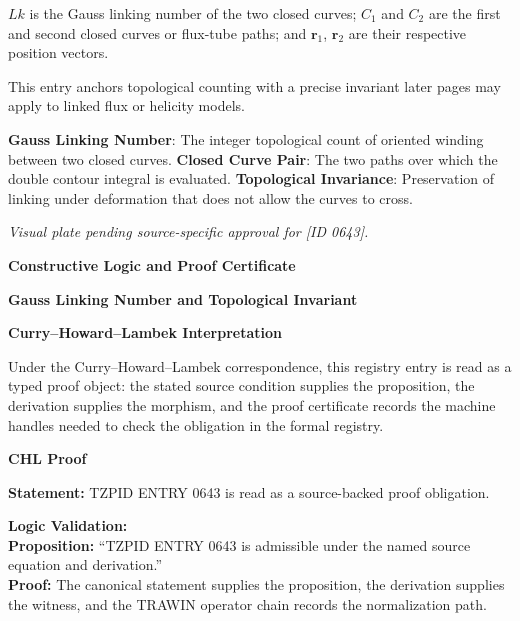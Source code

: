 
\(Lk\) is the Gauss linking number of the two closed curves; \(C_1\) and \(C_2\) are the first and second closed curves or flux-tube paths; and \(\mathbf{r}_1\), \(\mathbf{r}_2\) are their respective position vectors.


This entry anchors topological counting with a precise invariant later pages may apply to linked flux or helicity models.


\noindent \textbf{Gauss Linking Number}: The integer topological count of oriented winding between two closed curves. \enspace\textbullet\enspace \textbf{Closed Curve Pair}: The two paths over which the double contour integral is evaluated. \enspace\textbullet\enspace \textbf{Topological Invariance}: Preservation of linking under deformation that does not allow the curves to cross.\par

\endgroup

\begingroup\footnotesize\itshape
Visual plate pending source-specific approval for [ID 0643].
\par\endgroup

\clearpage
\begingroup\tzpsupportsetup
\noindent\textbf{\fontsize{10.8pt}{12.8pt}\selectfont [ID 0643] Constructive Logic and Proof Certificate}\par
\noindent\textbf{\fontsize{10pt}{12pt}\selectfont Gauss Linking Number and Topological Invariant}\par
\vspace{0.45em}
\begingroup
\footnotesize
\setlength{\parskip}{0.22em}
\setlength{\parindent}{0pt}
\noindent\textbf{Curry--Howard--Lambek Interpretation}\par
Under the Curry--Howard--Lambek correspondence, this registry entry is read as a typed proof
object: the stated source condition supplies the proposition, the derivation supplies the
morphism, and the proof certificate records the machine handles needed to check the obligation
in the formal registry.

\vspace{0.45em}
\noindent\textbf{CHL Proof}\par
\textbf{Statement:} TZPID ENTRY 0643 is read as a source-backed proof obligation.

\textbf{Logic Validation:}\\
\textbf{Proposition:} ``TZPID ENTRY 0643 is admissible under the named source equation and derivation.''\\
\textbf{Proof:} The canonical statement supplies the proposition, the derivation supplies the witness, and the TRAWIN operator chain records the normalization path.

